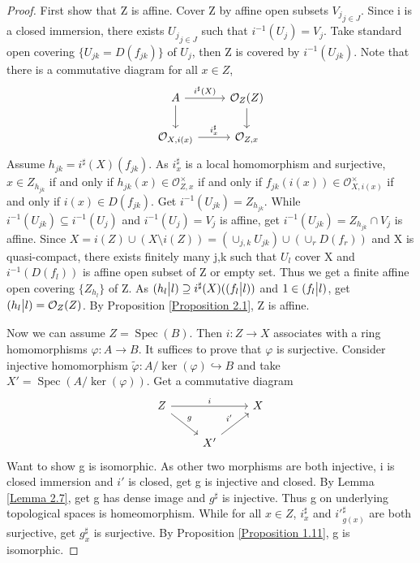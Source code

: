 \documentclass{ctexart}
\newcommand{\spec}{\operatorname{Spec}}
\begin{document}
\begin{proof}
    First show that Z is affine.
    Cover Z by affine open subsets ${V_{j}}_{j\in J}$.
    Since i is a closed immersion, there exists ${U_{j}}_{j\in J}$ such that $i^{-1}(U_{j}) = V_{j}$.
    Take standard open covering $\{U_{jk} = D(f_{jk})\}$ of $U_{j}$, then Z is covered by $i^{-1}(U_{jk})$.
    Note that there is a commutative diagram for all $x\in Z$,
    \begin{equation*}
        \begin{tikzcd}
            A \arrow[r, "i^{\sharp}(X)"] \arrow[d] &
            \mathcal{O}_{Z}(Z) \arrow[d] \\
            \mathcal{O}_{X, i(x)} \arrow[r, "i_{x}^{\sharp}"] &
            \mathcal{O}_{Z, x}
        \end{tikzcd}
    \end{equation*}
    Assume $h_{jk} = i^{\sharp}(X)(f_{jk})$.
    As $i_{x}^{\sharp}$ is a local homomorphism and surjective, $x\in Z_{h_{jk}}$ if and only if $h_{jk}(x)\in \mathcal{O}_{Z, x}^{\times}$ if and only if $f_{jk}(i(x))\in \mathcal{O}_{X, i(x)}^{\times}$ if and only if $i(x)\in D(f_{jk})$.
    Get $i^{-1}(U_{jk}) = Z_{h_{jk}}$.
    While $i^{-1}(U_{jk}) \subseteq i^{-1}(U_{j})$ and $i^{-1}(U_{j}) = V_{j}$ is affine, get $i^{-1}(U_{jk}) = Z_{h_{jk}} \cap V_{j}$ is affine.
    Since $X = i(Z) \cup (X \setminus i(Z)) = (\cup_{j, k} U_{jk}) \cup (\cup_{r} D(f_{r}))$ and X is quasi-compact, 
    there exists finitely many j,k such that $U_{l}$ cover X and $i^{-1}(D(f_{l}))$ is affine open subset of Z or empty set.
    Thus we get a finite affine open covering $\{Z_{h_{l}}\}$ of Z.
    As $(h_{l} \big{|} l) \supseteq i^{\sharp}(X)((f_{l} \big{|} l))$ and $1\in (f_{l} \big{|} l)$, get $(h_{l} \big{|} l) = \mathcal{O}_{Z}(Z)$.
    By Proposition \ref{Proposition 2.1}, Z is affine.
    \par
    Now we can assume $Z = \spec(B)$.
    Then $i: Z \longrightarrow X$ associates with a ring homomorphisms $\varphi: A \longrightarrow B$.
    It suffices to prove that $\varphi$ is surjective.
    Consider injective homomorphism $\widetilde{\varphi}: A/\ker(\varphi) \hookrightarrow B$ and take $X' = \spec(A/\ker(\varphi))$.
    Get a commutative diagram
    \begin{equation*}
        \begin{tikzcd}
            Z \arrow[rr, "i"] \arrow[dr, "g"] &&
            X \\
            & X' \arrow[ur, "i'"] &
        \end{tikzcd}
    \end{equation*}
    Want to show g is isomorphic.
    As other two morphisms are both injective, i is closed immersion and $i'$ is closed, get g is injective and closed.
    By Lemma \ref{Lemma 2.7}, get g has dense image and $g^{\sharp}$ is injective.
    Thus g on underlying topological spaces is homeomorphism.
    While for all $x\in Z$, $i_{x}^{\sharp}$ and ${i'}_{g(x)}^{\sharp}$ are both surjective, get $g_{x}^{\sharp}$ is surjective.
    By Proposition \ref{Proposition 1.11}, g is isomorphic.
\end{proof}
\end{document}
